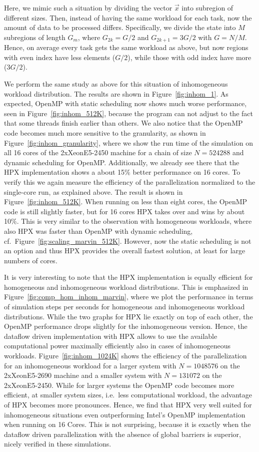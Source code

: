 \documentclass[10pt]{elsarticle}
\begin{document}
Here, we mimic such a situation by dividing the vector $\vec x$ into subregion of different sizes.
Then, instead of having the same workload for each task, now the amount of data to be processed differs.
Specifically, we divide the state into $M$ subregions of length $G_m$, where $G_{2k}=G/2$ and $G_{2k+1}=3G/2$ with $G=N/M$.
Hence, on average every task gets the same workload as above, but now regions with even index have less elements ($G/2$), while those with odd index have more ($3G/2$).

We perform the same study as above for this situation of inhomogeneous workload distribution.
The results are shown in Figure~\ref{fig:inhom_1}.
As expected, OpenMP with static scheduling now shows much worse performance, seen in Figure~\ref{fig:inhom_512K}, because the program can not adjust to the fact that some threads finish earlier than others.
We also notice that the OpenMP code becomes much more sensitive to the granularity, as shown in Figure~\ref{fig:inhom_granularity}, where we show the run time of the simulation on all 16 cores of the  2xXeonE5-2450 machine for a chain of size $N=524288$ and dynamic scheduling for OpenMP.
Additionally, we already see there that the HPX implementation shows a about 15\% better performance on 16 cores.
To verify this we again measure the efficiency of the parallelization normalized to the single-core run, as explained above.
The result is shown in Figure~\ref{fig:inhom_512K}.
When running on less than eight cores, the OpenMP code is still slightly faster, but for 16 cores HPX takes over and wins by about 10\%.
This is very similar to the observation with homogeneous workloads, where also HPX was faster than OpenMP with dynamic scheduling, cf.\ Figure~\ref{fig:scaling_marvin_512K}.
However, now the static scheduling is not an option and thus HPX provides the overall fastest solution, at least for large numbers of cores.

It is very interesting to note that the HPX implementation is equally efficient for homogeneous and inhomogeneous workload distributions.
This is emphasized in Figure~\ref{fig:comp_hom_inhom_marvin}, where we plot the performance in terms of simulation steps per seconds for homogeneous and inhomogeneous workload distributions.
While the two graphs for HPX lie exactly on top of each other, the OpenMP performance drops slightly for the inhomogeneous version.
Hence, the dataflow driven implementation with HPX allows to use the available computational power maximally efficiently also in cases of inhomogeneous workloads.
Figure~\ref{fig:inhom_1024K} shows the efficiency of the parallelization for an inhomogeneous workload for a larger system with $N=1048576$ on the 2xXeonE5-2690 machine and a smaller system with $N=131072$ on the 2xXeonE5-2450.
While for larger systems the OpenMP code becomes more efficient, at smaller system sizes, i.e.\ less computational workload, the advantage of HPX becomes more pronounces.
Hence, we find that HPX very well suited for inhomogeneous situations even outperforming Intel's OpenMP implementation when running on 16 Cores.
This is not surprising, because it is exactly when the dataflow driven parallelization with the absence of global barriers is superior, nicely verified in these simulations.
\end{document}
